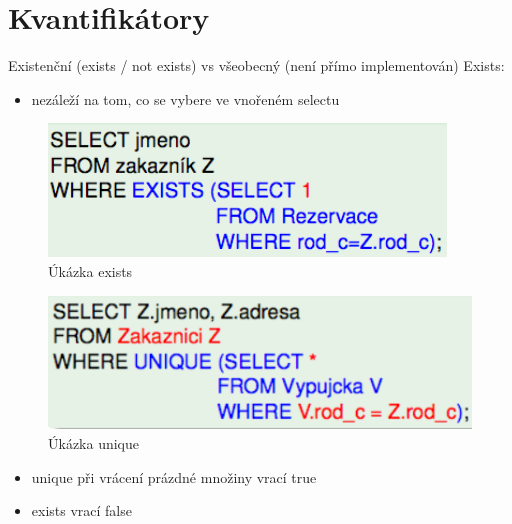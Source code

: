 \documentclass{szzclass}
\begin{document}
\section{Kvantifikátory}
Existenční (exists / not exists) vs všeobecný (není přímo implementován)
\newline
Exists:
\begin{itemize}
    \item nezáleží na tom, co se vybere ve vnořeném selectu
\end{itemize}
\begin{figure}[h!]
    \centering
    \includegraphics[width = 0.6 \textwidth]{topics/bi-wsi-si-04/images/exists.png}
    \caption{Úkázka exists}
\end{figure}
\begin{figure}[h!]
    \centering
    \includegraphics[width = 0.6 \textwidth]{topics/bi-wsi-si-04/images/unique.png}
    \caption{Úkázka unique}
\end{figure}
\begin{itemize}
    \item unique při vrácení prázdné množiny vrací true
    \item exists vrací false
\end{itemize}
\end{document}
